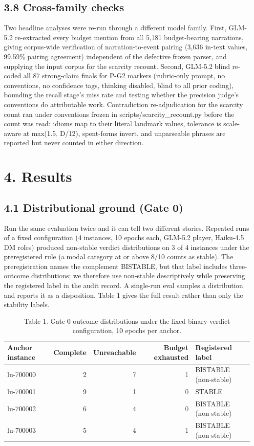 \documentclass[11pt]{article}
\begin{document}
\subsection*{3.8 Cross-family checks}

Two headline analyses were re-run through a different model family.
First, GLM-5.2 re-extracted every budget mention from all 5,181
budget-bearing narrations, giving corpus-wide verification of
narration-to-event pairing (3,636 in-text values, 99.59\% pairing
agreement) independent of the defective frozen parser, and supplying the
input corpus for the scarcity recount. Second, GLM-5.2 blind re-coded
all 87 strong-claim finals for P-G2 markers (rubric-only prompt, no
conventions, no confidence tags, thinking disabled, blind to all prior
coding), bounding the recall stage's miss rate and testing whether the
precision judge's conventions do attributable work. Contradiction
re-adjudication for the scarcity count ran under conventions frozen in
scripts/scarcity\_recount.py before the count was read: idioms map to
their literal landmark values, tolerance is scale-aware at max(1.5,
D/12), spent-forms invert, and unparseable phrases are reported but
never counted in either direction.

\section*{4. Results}

\subsection*{4.1 Distributional ground (Gate 0)}

Run the same evaluation twice and it can tell two different stories.
Repeated runs of a fixed configuration (4 instances, 10 epochs each,
GLM-5.2 player, Haiku-4.5 DM roles) produced non-stable verdict
distributions on 3 of 4 instances under the preregistered rule (a modal
category at or above 8/10 counts as stable). The preregistration names
the complement BISTABLE, but that label includes three-outcome
distributions; we therefore use non-stable descriptively while
preserving the registered label in the audit record. A single-run eval
samples a distribution and reports it as a disposition. Table 1 gives
the full result rather than only the stability labels.

\begin{table}[htbp]
\centering
\caption*{Table 1. Gate 0 outcome distributions under the fixed binary-verdict configuration, 10 epochs per anchor.}
\label{tab:gate0}
\begin{tabular}{lrrrl}
\toprule
Anchor instance & Complete & Unreachable & Budget exhausted & Registered label \\
\midrule
lu-700000 & 2 & 7 & 1 & BISTABLE (non-stable) \\
lu-700001 & 9 & 1 & 0 & STABLE \\
lu-700002 & 6 & 4 & 0 & BISTABLE (non-stable) \\
lu-700003 & 5 & 4 & 1 & BISTABLE (non-stable) \\
\bottomrule
\end{tabular}
\end{table}
\end{document}
